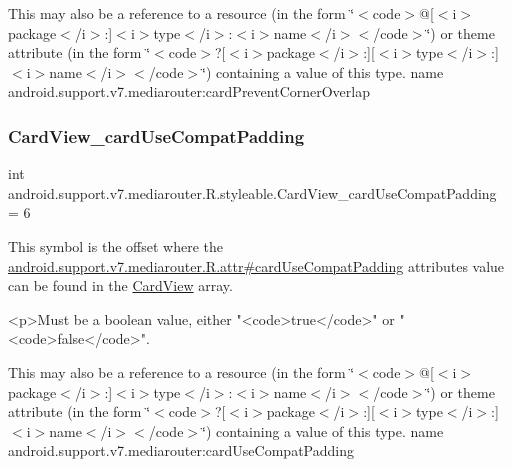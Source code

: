 This may also be a reference to a resource (in the form \char`\"{}$<$code$>$@\mbox{[}$<$i$>$package$<$/i$>$\+:\mbox{]}$<$i$>$type$<$/i$>$\+:$<$i$>$name$<$/i$>$$<$/code$>$\char`\"{}) or theme attribute (in the form \char`\"{}$<$code$>$?\mbox{[}$<$i$>$package$<$/i$>$\+:\mbox{]}\mbox{[}$<$i$>$type$<$/i$>$\+:\mbox{]}$<$i$>$name$<$/i$>$$<$/code$>$\char`\"{}) containing a value of this type.  name android.\+support.\+v7.\+mediarouter\+:card\+Prevent\+Corner\+Overlap \mbox{\label{classandroid_1_1support_1_1v7_1_1mediarouter_1_1R_1_1styleable_a60a82a1904d0a54f4044b392f62eecfb}} 
\subsubsection{\texorpdfstring{Card\+View\+\_\+card\+Use\+Compat\+Padding}{CardView\_cardUseCompatPadding}}
{\footnotesize\ttfamily int android.\+support.\+v7.\+mediarouter.\+R.\+styleable.\+Card\+View\+\_\+card\+Use\+Compat\+Padding = 6\hspace{0.3cm}{\ttfamily [static]}}

This symbol is the offset where the \hyperlink{classandroid_1_1support_1_1v7_1_1mediarouter_1_1R_1_1attr_ad80309d0db49d779271fad3c274a8e88}{android.\+support.\+v7.\+mediarouter.\+R.\+attr\#card\+Use\+Compat\+Padding} attribute\textquotesingle{}s value can be found in the \hyperlink{classandroid_1_1support_1_1v7_1_1mediarouter_1_1R_1_1styleable_a58720bc744e6374c25e81b8ae15a2c6a}{Card\+View} array.

\begin{DoxyVerb}      <p>Must be a boolean value, either "<code>true</code>" or "<code>false</code>".
\end{DoxyVerb}
 

This may also be a reference to a resource (in the form \char`\"{}$<$code$>$@\mbox{[}$<$i$>$package$<$/i$>$\+:\mbox{]}$<$i$>$type$<$/i$>$\+:$<$i$>$name$<$/i$>$$<$/code$>$\char`\"{}) or theme attribute (in the form \char`\"{}$<$code$>$?\mbox{[}$<$i$>$package$<$/i$>$\+:\mbox{]}\mbox{[}$<$i$>$type$<$/i$>$\+:\mbox{]}$<$i$>$name$<$/i$>$$<$/code$>$\char`\"{}) containing a value of this type.  name android.\+support.\+v7.\+mediarouter\+:card\+Use\+Compat\+Padding \mbox{\label{classandroid_1_1support_1_1v7_1_1mediarouter_1_1R_1_1styleable_af7ef5322522613934b0e313cc0c155b6}} 
